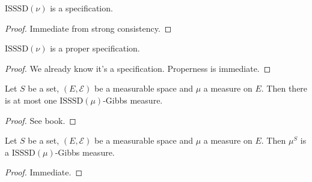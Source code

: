 \begin{lemma}
    \label{lem:isssd-specification}

    $\text{ISSSD}(\nu)$ is a specification.
\end{lemma}
\begin{proof}

    Immediate from strong consistency.
\end{proof}

\begin{lemma}
    \label{lem:isssd-proper-specification}

    $\text{ISSSD}(\nu)$ is a proper specification.
\end{lemma}
\begin{proof}

    We already know it's a specification. Properness is immediate.
\end{proof}

\begin{lemma}
    \label{lem:gibbs-measure-uniqueness}

    Let $S$ be a set, $(E, \mathcal{E})$ be a measurable space and $\mu$ a measure on $E$. Then there is at most one $\text{ISSSD}(\mu)$-Gibbs measure.
\end{lemma}
\begin{proof}

    See book.
\end{proof}

\begin{lemma}
    \label{lem:gibbs-measure-existence}

    Let $S$ be a set, $(E, \mathcal{E})$ be a measurable space and $\mu$ a measure on $E$. Then $\mu^S$ is a $\text{ISSSD}(\mu)$-Gibbs measure.
\end{lemma}
\begin{proof}
   Immediate.
\end{proof}
